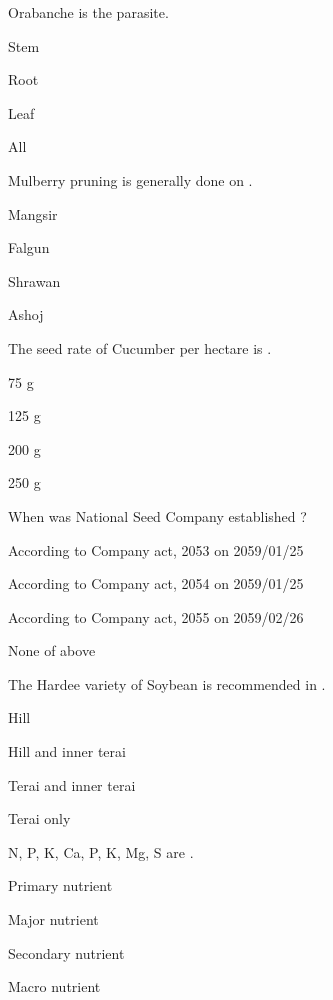 \begin{questions}
\question Orabanche is the \fillin[][3cm] parasite.
\begin{items}
\item Stem
\item* Root
\item Leaf
\item All
\end{items}

\question Mulberry pruning is generally done on \fillin[][3cm].
\begin{items}
\item Mangsir
\item* Falgun
\item Shrawan
\item Ashoj
\end{items}

\question The seed rate of Cucumber per hectare is \fillin[][3cm].
\begin{items}
\item 75 g
\item* 125 g
\item 200 g
\item 250 g
\end{items}

\question When was National Seed Company established ?
\begin{items}
\item* According to Company act, 2053 on 2059/01/25
\item According to Company act, 2054 on 2059/01/25
\item According to Company act, 2055 on 2059/02/26
\item None of above
\end{items}

\question The Hardee variety of Soybean is recommended in \fillin[][3cm].
\begin{items}
\item Hill
\item Hill and inner terai
\item* Terai and inner terai
\item Terai only
\end{items}

\question N, P, K, Ca, P, K, Mg, S are \fillin[][3cm].
\begin{items}
\item Primary nutrient
\item Major nutrient
\item Secondary nutrient
\item* Macro nutrient
\end{items}


\end{questions}
